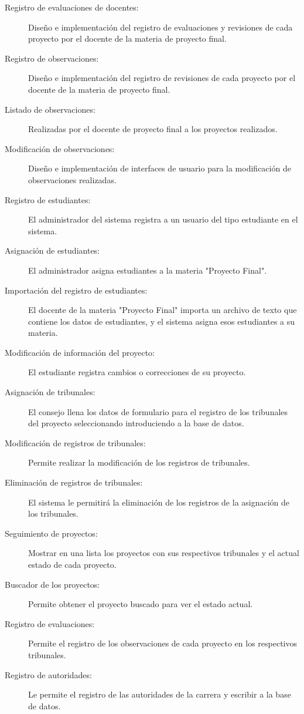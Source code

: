 \documentclass[10pt,letterpaper,twoside]{article}
\begin{document}
\begin{multicols}{2}
\begin{description}
    \item [Registro de evaluaciones de docentes:] Diseño e implementación del registro de evaluaciones y revisiones de cada proyecto por el docente de la materia de proyecto final.
    \item [Registro de observaciones:] Diseño e implementación del registro de revisiones de cada proyecto por el docente de la materia de proyecto final.
    \item [Listado de observaciones:] Realizadas por el docente de proyecto final a los proyectos realizados.
    \item [Modificación de observaciones:] Diseño e implementación de interfaces de usuario para la modificación de observaciones realizadas.
    \item [Registro de estudiantes:] El administrador del sistema registra a un usuario del tipo estudiante en el sistema.
    \item [Asignación de estudiantes:] El administrador asigna estudiantes a la materia "Proyecto Final".
    \item [Importación del registro de estudiantes:] El docente de la materia "Proyecto Final" importa un archivo de texto que contiene los datos de estudiantes, y el sistema asigna esos estudiantes a su materia.
    \item [Modificación de información del proyecto:] El estudiante registra cambios o correcciones de su proyecto.
    \item [Asignación de tribunales:] El consejo llena los datos de formulario para el registro de los tribunales del proyecto seleccionando introduciendo a la base de datos.
    \item [Modificación de registros de tribunales:] Permite realizar la modificación de los registros de tribunales.
    \item [Eliminación de registros de tribunales:] El sistema le permitirá la eliminación de los registros de la asignación de los tribunales.
    \item [Seguimiento de proyectos:] Mostrar en una lista los proyectos con sus respectivos tribunales y el actual estado de cada proyecto.
    \item [Buscador de los proyectos:] Permite obtener el proyecto buscado para ver el estado actual.
    \item [Registro de evaluaciones:] Permite el registro de los observaciones de cada proyecto en los respectivos tribunales.
    \item [Registro de autoridades:] Le permite el registro de las autoridades de la carrera y escribir a la base de datos.

\end{description}
\end{multicols}
\end{document}
